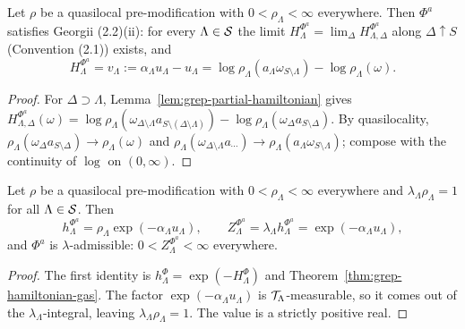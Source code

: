\begin{theorem}
    \label{thm:grep-hamiltonian-gas}
    \leanok

    Let $\rho$ be a quasilocal pre-modification with $0 < \rho_\Lambda < \infty$ everywhere.  Then
    $\Phi^a$ satisfies Georgii (2.2)(ii): for every $\Lambda \in \mathcal{S}$ the limit
    $H^{\Phi^a}_\Lambda = \lim_\Delta H^{\Phi^a}_{\Lambda,\Delta}$ along $\Delta \uparrow S$
    (Convention (2.1)) exists, and
    \[
        H^{\Phi^a}_\Lambda = v_\Lambda := \alpha_\Lambda u_\Lambda - u_\Lambda
        = \log \rho_\Lambda(a_\Lambda \omega_{S\setminus\Lambda}) - \log \rho_\Lambda(\omega).
    \]
\end{theorem}
\begin{proof}
    \leanok

    For $\Delta \supset \Lambda$, Lemma~\ref{lem:grep-partial-hamiltonian} gives
    $H^{\Phi^a}_{\Lambda,\Delta}(\omega) = \log \rho_\Lambda(\omega_{\Delta\setminus\Lambda}a_{S\setminus(\Delta\setminus\Lambda)})
    - \log \rho_\Lambda(\omega_\Delta a_{S\setminus\Delta})$.  By quasilocality,
    $\rho_\Lambda(\omega_\Delta a_{S\setminus\Delta}) \to \rho_\Lambda(\omega)$ and
    $\rho_\Lambda(\omega_{\Delta\setminus\Lambda}a_{\cdots}) \to \rho_\Lambda(a_\Lambda\omega_{S\setminus\Lambda})$;
    compose with the continuity of $\log$ on $(0,\infty)$.
\end{proof}

\begin{lemma}
    \label{lem:grep-partition-function}
    \leanok

    Let $\rho$ be a quasilocal pre-modification with $0 < \rho_\Lambda < \infty$ everywhere and
    $\lambda_\Lambda \rho_\Lambda = 1$ for all $\Lambda \in \mathcal{S}$.  Then
    \[
        h^{\Phi^a}_\Lambda = \rho_\Lambda \exp(-\alpha_\Lambda u_\Lambda),
        \qquad
        Z^{\Phi^a}_\Lambda = \lambda_\Lambda h^{\Phi^a}_\Lambda = \exp(-\alpha_\Lambda u_\Lambda),
    \]
    and $\Phi^a$ is $\lambda$-admissible: $0 < Z^{\Phi^a}_\Lambda < \infty$ everywhere.
\end{lemma}
\begin{proof}
    \leanok

    The first identity is $h^\Phi_\Lambda = \exp(-H^\Phi_\Lambda)$ and
    Theorem~\ref{thm:grep-hamiltonian-gas}.  The factor $\exp(-\alpha_\Lambda u_\Lambda)$ is
    $\mathcal{T}_\Lambda$-measurable, so it comes out of the $\lambda_\Lambda$-integral, leaving
    $\lambda_\Lambda \rho_\Lambda = 1$.  The value is a strictly positive real.
\end{proof}

